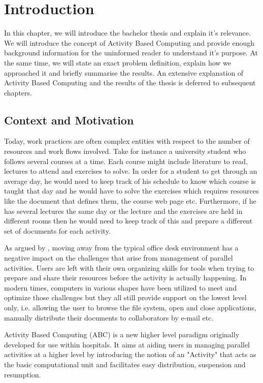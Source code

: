 \chapter{Introduction}
In this chapter, we will introduce the bachelor thesis and explain it's relevance. We will introduce the concept of Activity Based Computing and provide enough background information for the uninformed reader to understand it's purpose. At the same time, we will state an exact problem definition, explain how we approached it and briefly summarise the results. An extensive explanation of Activity Based Computing and the results of the thesis is deferred to subsequent chapters.

\section{Context and Motivation}
Today, work practices are often complex entities with respect to the number of resources and work flows involved. Take for instance a university student who follows several courses at a time. Each course might include literature to read, lectures to attend and exercises to solve. In order for a student to get through an average day, he would need to keep track of his schedule to know which course is taught that day and he would have to solve the exercises which requires resources like the document that defines them, the course web page etc. Furthermore, if he has several lectures the same day or the lecture and the exercises are held in different rooms then he would need to keep track of this and prepare a different set of documents for each activity.

As argued by \citet{bardram2011}, moving away from the typical office desk environment has a negative impact on the challenges that arise from management of parallel activities. Users are left with their own organizing skills for tools when trying to prepare and share their resources before the activity is actually happening. In modern times, computers in various shapes have been utilized to meet and optimize those challenges but they all still provide support on the lowest level only, i.e. allowing the user to browse the file system, open and close applications, manually distribute their documents to collaborators by e-mail etc.

Activity Based Computing (ABC) is a new higher level paradigm originally developed for use within hospitals. It aims at aiding users in managing parallel activities at a higher level by introducing the notion of an "Activity" that acts as the basic computational unit and facilitates easy distribution, suspension and resumption.

